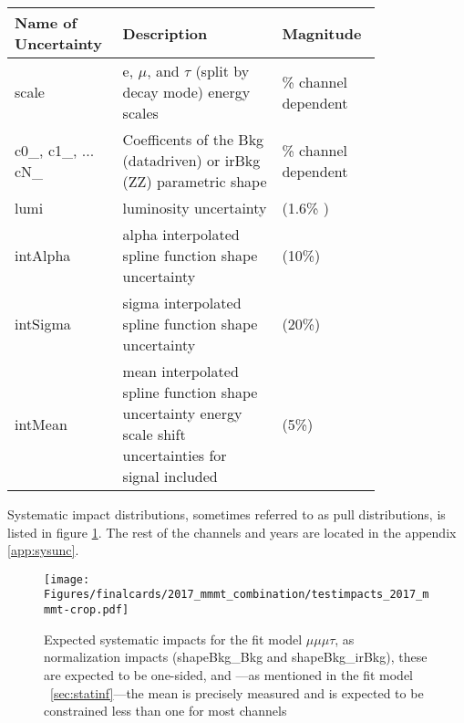 \begin{table}[h!tb]
\centering
{}
\begin{tabular}{|p{0.2\linewidth}|p{0.4\linewidth}|p{0.2\linewidth}}
\hline  
Name of Uncertainty & Description & Magnitude\\\hline
scale &  e, $\mu$, and $\tau$ (split by decay mode) energy scales & \% channel dependent \\\hline
 c0\_, c1\_, ... cN\_& Coefficents of the Bkg (datadriven) or irBkg (ZZ) parametric shape & \% channel dependent \\\hline
lumi & luminosity uncertainty & (1.6\% ) \\\hline
intAlpha & alpha interpolated spline function shape uncertainty & (10\%) \\\hline
intSigma & sigma interpolated spline function shape uncertainty & (20\%) \\\hline
intMean & mean interpolated spline function shape uncertainty energy scale shift uncertainties for signal included & (5\%) \\\hline
\end{tabular}
\end{table}
\clearpage 

Systematic impact distributions, sometimes referred to as pull distributions, is listed in figure \ref{fig:impacts_2017_mmmt}. The rest of the channels and years are located in the appendix \ref{app:sysunc}.

\begin{figure}[ht!b]
    \centering 
\texttt{[image: Figures/finalcards/2017\_mmmt\_combination/testimpacts\_2017\_mmmt-crop.pdf]}
    \caption{\label{fig:impacts_2017_mmmt} Expected systematic impacts for the fit model $\mu\mu\mu\tau$, as normalization impacts (shapeBkg\_Bkg and shapeBkg\_irBkg), these are expected to be one-sided, and ---as mentioned in the fit model ~\ref{sec:statinf}---the mean is precisely measured and is expected to be constrained less than one for most channels }
\end{figure}




